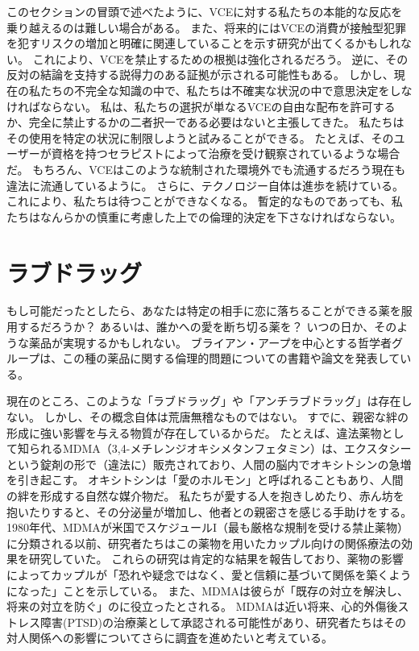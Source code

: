 \documentclass[paper=a4,book,openany]{jlreq} \usepackage{mystyle}
\begin{document}
このセクションの冒頭で述べたように、VCEに対する私たちの本能的な反応を乗り越えるのは難しい場合がある。
また、将来的にはVCEの消費が接触型犯罪を犯すリスクの増加と明確に関連していることを示す研究が出てくるかもしれない。
これにより、VCEを禁止するための根拠は強化されるだろう。
逆に、その反対の結論を支持する説得力のある証拠が示される可能性もある。
しかし、現在の私たちの不完全な知識の中で、私たちは不確実な状況の中で意思決定をしなければならない。
私は、私たちの選択が単なるVCEの自由な配布を許可するか、完全に禁止するかの二者択一である必要はないと主張してきた{\DDASH}。
私たちはその使用を特定の状況に制限しようと試みることができる。
たとえば、そのユーザーが資格を持つセラピストによって治療を受け観察されているような場合だ。
もちろん、VCEはこのような統制された環境外でも流通するだろう{\DDASH}現在も違法に流通しているように。
さらに、テクノロジー自体は進歩を続けている。
これにより、私たちは待つことができなくなる。
暫定的なものであっても、私たちはなんらかの慎重に考慮した上での倫理的決定を下さなければならない。

\section{ラブドラッグ}

もし可能だったとしたら、あなたは特定の相手に恋に落ちることができる薬を服用するだろうか？ あるいは、誰かへの愛を断ち切る薬を？ いつの日か、そのような薬品が実現するかもしれない。
ブライアン・アープを中心とする哲学者グループは、この種の薬品に関する倫理的問題についての書籍や論文を発表している。

現在のところ、このような「ラブドラッグ」や「アンチラブドラッグ」は存在しない。
しかし、その概念自体は荒唐無稽なものではない。
すでに、親密な絆の形成に強い影響を与える物質が存在しているからだ。
たとえば、違法薬物として知られるMDMA（3,4-メチレンジオキシメタンフェタミン）は、エクスタシーという錠剤の形で（違法に）販売されており、人間の脳内でオキシトシンの急増を引き起こす。
オキシトシンは「愛のホルモン」と呼ばれることもあり、人間の絆を形成する自然な媒介物だ。
私たちが愛する人を抱きしめたり、赤ん坊を抱いたりすると、その分泌量が増加し、他者との親密さを感じる手助けをする。
1980年代、MDMAが米国でスケジュールI（最も厳格な規制を受ける禁止薬物）に分類される以前、研究者たちはこの薬物を用いたカップル向けの関係療法の効果を研究していた。
これらの研究は肯定的な結果を報告しており、薬物の影響によってカップルが「恐れや疑念ではなく、愛と信頼に基づいて関係を築くようになった」ことを示している。
また、MDMAは彼らが「既存の対立を解決し、将来の対立を防ぐ」のに役立ったとされる\citep[p.378]{greer98:_method_conduc_therap_session_mdma}。
MDMAは近い将来、心的外傷後ストレス障害(PTSD)の治療薬として承認される可能性があり、研究者たちはその対人関係への影響についてさらに調査を進めたいと考えている。
\end{document}
